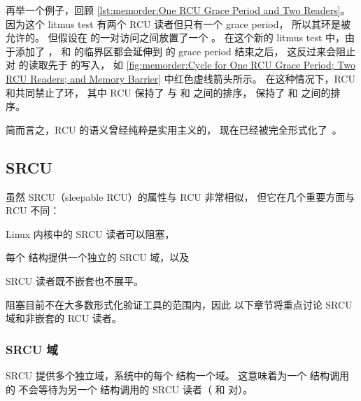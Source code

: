 再举一个例子，回顾
\cref{lst:memorder:One RCU Grace Period and Two Readers}。
因为这个 litmus test 有两个 RCU 读者但只有一个 grace period，
所以其环是被允许的。
但假设在  的一对访问之间放置了一个 。
在这个新的 litmus test 中，由于添加了 ，
 和  的临界区都会延伸到
 的 grace period 结束之后，
这反过来会阻止  对  的读取先于  的写入，
如 \cref{fig:memorder:Cycle for One RCU Grace Period; Two RCU Readers; and Memory Barrier}
中红色虚线箭头所示。
在这种情况下，RCU 和共同禁止了环，
其中 RCU 保持了  与  和  之间的排序，
 保持了  和  之间的排序。

\QuickQuizEnd

简而言之，RCU 的语义曾经纯粹是实用主义的，
现在已经被完全形式化了~\cite{PaulMcKenney2005RCUSemantics,MathieuDesnoyers2012URCU,AlexeyGotsman2013ESOPRCU,Alglave:2018:FSC:3173162.3177156}。

\subsection{SRCU}
\label{sec:memorder:SRCU}

虽然 SRCU（sleepable RCU）的属性与 RCU 非常相似，
但它在几个重要方面与 RCU 不同：
\begin{enumerate*}[(1)]
\item	Linux 内核中的 SRCU 读者可以阻塞，
\item	每个  结构提供一个独立的 SRCU 域，以及
\item	SRCU 读者既不嵌套也不展平。
\end{enumerate*}

阻塞目前不在大多数形式化验证工具的范围内，因此
以下章节将重点讨论 SRCU 域和非嵌套的
RCU 读者。

\subsubsection{SRCU 域}
\label{sec:memorder:SRCU Domains}

SRCU 提供多个独立域，系统中的每个 
结构一个域。
这意味着为一个 
结构调用的  不会等待为另一个 
结构调用的 SRCU 读者（ 和
 对）。

